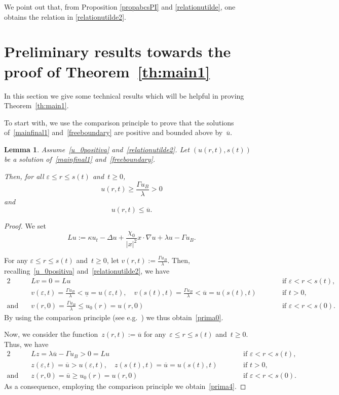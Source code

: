 \documentclass[12pt,a4paper,intlimits,sumlimits]{amsart}
\theoremstyle{definition}
\theoremstyle{plain}
\newtheorem{lemma}[definition]{Lemma}
\numberwithin{equation}{section}
\renewcommand{\leq}{\leqslant}
\renewcommand{\le}{\leqslant}
\renewcommand{\ge}{\geqslant}
\begin{document}
We point out that, from Proposition \ref{propabcsPI} and \eqref{relationutilde}, one obtains the relation in  \eqref{relationutilde2}.

\section{Preliminary results towards the proof of Theorem~\ref{th:main1}}\label{dtfygubhijnkml,ò.-aklmSJNBH}


In this section we give some technical results which will be helpful in proving Theorem~\ref{th:main1}.

To start with, we use the comparison principle to prove that the solutions of~\eqref{mainfinal1} and~\eqref{freeboundary} are positive and bounded above by~$\overline{u}$.

\begin{lemma}\label{lemma0<u<utilde}
Assume~\eqref{u_0positiva} and~\eqref{relationutilde2}.
Let $(u(r,t), s(t))$ be a solution of~\eqref{mainfinal1} and~\eqref{freeboundary}.

Then, for all $\varepsilon\le r\le s(t)$ and~$t\ge0$,
\begin{equation}\label{prima0}
u(r,t)\ge \frac{\Gamma u_B}{\lambda}>0
\end{equation}
and
\begin{equation}\label{prima4}
u(r,t)\leq\overline{u}.
\end{equation}
\end{lemma}

\begin{proof} 
We set
$$ Lu:=\kappa u_t-\Delta u
+\frac{\chi_0}{|x|^2}x\cdot \nabla u+\lambda u
-\Gamma u_B.$$

For any $\varepsilon\le r\le s(t)$ and~$t\ge0$, let $v(r,t):=\frac{\Gamma u_B}{\lambda}$. Then, recalling~\eqref{u_0positiva} and~\eqref{relationutilde2}, we have
\begin{alignat*}{2}
&L v=0=Lu
\qquad  &&\mbox{if } \varepsilon<r<s(t), \\
&v(\varepsilon,t)=\frac{\Gamma u_B}{\lambda}<\underline{u}=u(\varepsilon,t),\quad v(s(t),t)=\frac{\Gamma u_B}{\lambda}<\overline{u}=u(s(t),t) \qquad  &&\mbox{if } t>0, \\
\mbox{and} \quad &v(r,0)=\frac{\Gamma u_B}{\lambda}\le u_0(r)=u(r,0) \qquad  &&\mbox{if } \varepsilon<r<s(0).
\end{alignat*}
By using the comparison principle
(see e.g.~\cite[Corollary~2.5]{MR1465184})
we thus obtain~\eqref{prima0}.

Now, we consider the function~$z(r,t):=\overline{u}$ for any~$\varepsilon\le r\le s(t)$ and~$t\ge0$.
Thus, we have
\begin{alignat*}{2}
&Lz
=\lambda\overline{u}-\Gamma u_B> 0=Lu
\qquad  &&\mbox{if } \varepsilon<r<s(t), \\
& z(\varepsilon,t)=\overline u>u(\varepsilon,t),\quad z(s(t),t)=\overline u=u(s(t),t) \qquad  &&\mbox{if } t>0,
\\
\mbox{and} \quad & z(r,0)=\overline{u}\ge u_0(r)=u(r,0) \qquad  &&\mbox{if } \varepsilon<r<s(0).
\end{alignat*}As a consequence, employing the
comparison principle we obtain~\eqref{prima4}.
\end{proof}
\end{document}
